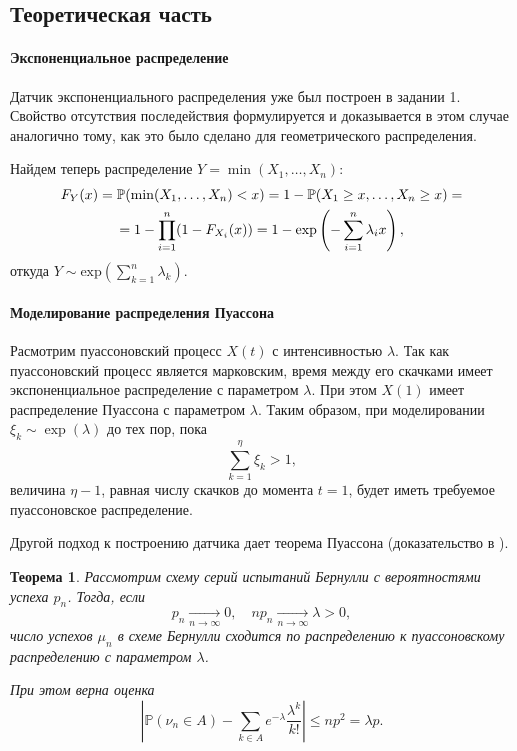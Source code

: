 \documentclass[16pt]{article}
\newtheorem{Th}{Теорема}
\begin{document}
\subsection{Теоретическая часть}
\paragraph{Экспоненциальное распределение}
Датчик экспоненциального распределения уже был построен в задании 1. Свойство отсутствия последействия формулируется и доказывается в этом случае аналогично тому, как это было сделано для геометрического распределения.

Найдем теперь распределение $Y = \min(X_1, \ldots, X_n)$:
\begin{multline}\notag
F_Y(x) = \mathbb{P}(\min(X_1, \ldots, X_n) < x) = 1 - \mathbb{P}(X_1 \geq x, \ldots, X_n \geq x) =\\= 1 - \prod_{i=1}^n(1- F_{X_i}(x)) = 1 -\exp\left(-\sum\limits_{i=1}^n \lambda_i x\right),
\end{multline}
откуда $Y \sim \mathrm{exp}\left(\sum_{k=1}^n \lambda_k\right)$.

\paragraph{Моделирование распределения Пуассона}
Расмотрим пуассоновский процесс $X(t)$ с интенсивностью $\lambda$. Так как пуассоновский процесс является марковским, время между его скачками имеет экспоненциальное распределение с параметром $\lambda$. При этом $X(1)$ имеет распределение Пуассона с параметром $\lambda$. Таким образом, при моделировании $\xi_k \sim \exp(\lambda)$ до тех пор, пока
$$\sum_{k=1}^\eta \xi_k > 1,$$
величина $\eta - 1$, равная числу скачков до момента $t = 1$, будет иметь требуемое пуассоновское распределение.

Другой подход к построению датчика дает теорема Пуассона (доказательство в \cite{Shir}).
\begin{Th}
Рассмотрим схему серий испытаний Бернулли с вероятностями успеха $p_n$. Тогда, если $$p_n \underset{n \to \infty}{\to} 0, \quad 
np_n \underset{n \to \infty}{\to} \lambda > 0,$$
число успехов $\mu_n$ в схеме Бернулли сходится по распределению к пуассоновскому распределению с параметром $\lambda$.

При этом верна оценка
$$\left|\mathbb{P}(\nu_n \in A) - \sum_{k \in A}e^{-\lambda}\dfrac{\lambda^k}{k!}\right| \leq np^2 = \lambda p.$$
\end{Th}
\end{document}
